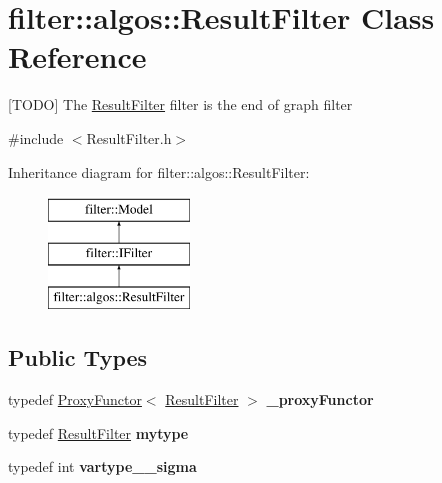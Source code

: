 \hypertarget{classfilter_1_1algos_1_1_result_filter}{}\section{filter\+:\+:algos\+:\+:Result\+Filter Class Reference}
\label{classfilter_1_1algos_1_1_result_filter}


\mbox{[}T\+O\+DO\mbox{]} The \hyperlink{classfilter_1_1algos_1_1_result_filter}{Result\+Filter} filter is the end of graph filter  




{\ttfamily \#include $<$Result\+Filter.\+h$>$}

Inheritance diagram for filter\+:\+:algos\+:\+:Result\+Filter\+:\begin{figure}[H]
\begin{center}
\leavevmode
\includegraphics[height=3.000000cm]{d8/d8c/classfilter_1_1algos_1_1_result_filter}
\end{center}
\end{figure}
\subsection*{Public Types}
\begin{DoxyCompactItemize}
\item 
\mbox{\label{classfilter_1_1algos_1_1_result_filter_abaa3ef337e1be76be551a55204b53dcb}} 
typedef \hyperlink{class_proxy_functor}{Proxy\+Functor}$<$ \hyperlink{classfilter_1_1algos_1_1_result_filter}{Result\+Filter} $>$ {\bfseries \+\_\+proxy\+Functor}
\item 
\mbox{\label{classfilter_1_1algos_1_1_result_filter_ad99e18058bb2ae0b9a4a9ca7b585192f}} 
typedef \hyperlink{classfilter_1_1algos_1_1_result_filter}{Result\+Filter} {\bfseries mytype}
\item 
\mbox{\label{classfilter_1_1algos_1_1_result_filter_a9ae87178ac405aecf9ed9bdc212b23dc}} 
typedef int {\bfseries vartype\+\_\+\+\_\+sigma}
\end{DoxyCompactItemize}
